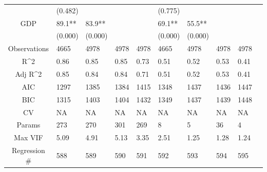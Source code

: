 \documentclass{article}
\begin{document}
\begin{table}[H]
\begin{tabular}{|clllllllll|}
   & (0.482) &  &  &  & (0.775) &  &  &  & \\ 
  GDP & 89.1** & 83.9** &  &  & 69.1** & 55.5** &  &  & \\ 
   & (0.000) & (0.000) &  &  & (0.000) & (0.000) &  &  & \\ 
  \hline 
 Observations & 4665 & 4978 & 4978 & 4978 & 4665 & 4978 & 4978 & 4978 & \\ 
  R^2 & 0.86 & 0.85 & 0.85 & 0.73 & 0.51 & 0.52 & 0.53 & 0.41 & \\ 
  Adj R^2 & 0.85 & 0.84 & 0.84 & 0.71 & 0.51 & 0.52 & 0.53 & 0.41 & \\ 
  AIC & 1297 & 1385 & 1384 & 1415 & 1348 & 1437 & 1436 & 1447 & \\ 
  BIC & 1315 & 1403 & 1404 & 1432 & 1349 & 1437 & 1439 & 1448 & \\ 
  CV & NA & NA & NA & NA & NA & NA & NA & NA & \\ 
  Params & 273 & 270 & 301 & 269 & 8 & 5 & 36 & 4 & \\ 
  Max VIF & 5.09 & 4.91 & 5.13 & 3.35 & 2.51 & 1.25 & 1.28 & 1.24 & \\ 
  Regression \# & 588 & 589 & 590 & 591 & 592 & 593 & 594 & 595 & \\ 
   \hline
\end{tabular}
 
\end{table}
\end{document}
